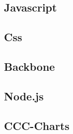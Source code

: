 	\subsection{Javascript}
			\lipsum[1-2]
	\subsection{Css}
			\lipsum[1-2]
	\subsection{Backbone}
			\lipsum[1-2]
	\subsection{Node.js}
			\lipsum[1-2]
	\subsection{CCC-Charts}
			\lipsum[1-2]

		
		
		
		
